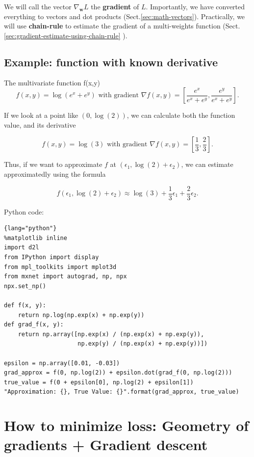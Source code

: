 We will call the vector $\nabla_{\mathbf{w}} L$ the {\bf gradient} of $L$.
Importantly, we have converted everything to vectors and dot products
(Sect.\ref{sec:math-vectors}).
Practically, we will use {\bf chain-rule} to estimate the gradient of a multi-weights function
(Sect.\ref{sec:gradient-estimate-using-chain-rule} \label{sec:chain-rule}).

\subsection{Example: function with known derivative}

The multivariate function f(x,y)
\begin{equation}
f(x, y) = \log(e^x + e^y) \text{ with gradient } \nabla f (x, y) = \left[\frac{e^x}{e^x+e^y}, \frac{e^y}{e^x+e^y}\right].
\end{equation}

If we look at a point like $(0, \log(2))$, we can calculate both the function value, and its derivative

$$
f(x, y) = \log(3) \text{ with gradient } \nabla f (x, y) = \left[\frac{1}{3}, \frac{2}{3}\right].
$$

Thus, if we want to approximate $f$ at $(\epsilon_1, \log(2) + \epsilon_2)$,  we can estimate approximatedly using the formula

$$
f(\epsilon_1, \log(2) + \epsilon_2) \approx \log(3) + \frac{1}{3}\epsilon_1 + \frac{2}{3}\epsilon_2.
$$

Python code:
\begin{lstlisting}{lang="python"}
%matplotlib inline
import d2l
from IPython import display
from mpl_toolkits import mplot3d
from mxnet import autograd, np, npx
npx.set_np()

def f(x, y):
    return np.log(np.exp(x) + np.exp(y))
def grad_f(x, y):
    return np.array([np.exp(x) / (np.exp(x) + np.exp(y)),
                     np.exp(y) / (np.exp(x) + np.exp(y))])

epsilon = np.array([0.01, -0.03])
grad_approx = f(0, np.log(2)) + epsilon.dot(grad_f(0, np.log(2)))
true_value = f(0 + epsilon[0], np.log(2) + epsilon[1])
"Approximation: {}, True Value: {}".format(grad_approx, true_value)
\end{lstlisting}

\section{How to minimize loss: Geometry of gradients + Gradient descent}
\label{sec:deep-learing-mathematical-intuition-learn-weights-steepest-descent-direction}

